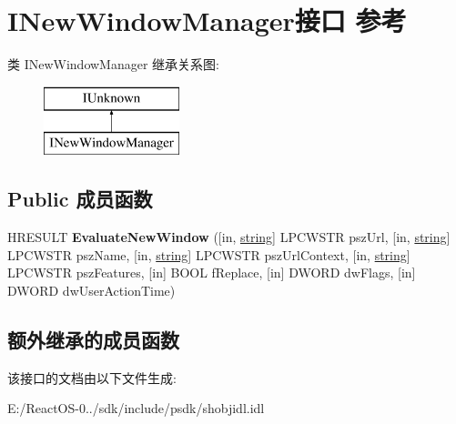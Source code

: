\hypertarget{interface_i_new_window_manager}{}\section{I\+New\+Window\+Manager接口 参考}
\label{interface_i_new_window_manager}
类 I\+New\+Window\+Manager 继承关系图\+:\begin{figure}[H]
\begin{center}
\leavevmode
\includegraphics[height=2.000000cm]{interface_i_new_window_manager}
\end{center}
\end{figure}
\subsection*{Public 成员函数}
\begin{DoxyCompactItemize}
\item 
\mbox{\label{interface_i_new_window_manager_a832310900265f3638c528c621d50ceda}} 
H\+R\+E\+S\+U\+LT {\bfseries Evaluate\+New\+Window} (\mbox{[}in, \hyperlink{structstring}{string}\mbox{]} L\+P\+C\+W\+S\+TR psz\+Url, \mbox{[}in, \hyperlink{structstring}{string}\mbox{]} L\+P\+C\+W\+S\+TR psz\+Name, \mbox{[}in, \hyperlink{structstring}{string}\mbox{]} L\+P\+C\+W\+S\+TR psz\+Url\+Context, \mbox{[}in, \hyperlink{structstring}{string}\mbox{]} L\+P\+C\+W\+S\+TR psz\+Features, \mbox{[}in\mbox{]} B\+O\+OL f\+Replace, \mbox{[}in\mbox{]} D\+W\+O\+RD dw\+Flags, \mbox{[}in\mbox{]} D\+W\+O\+RD dw\+User\+Action\+Time)
\end{DoxyCompactItemize}
\subsection*{额外继承的成员函数}


该接口的文档由以下文件生成\+:\begin{DoxyCompactItemize}
\item 
E\+:/\+React\+O\+S-\/0../sdk/include/psdk/shobjidl.\+idl\end{DoxyCompactItemize}
